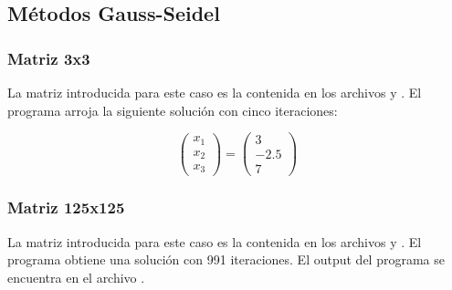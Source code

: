 \subsection{Métodos Gauss-Seidel}

\subsubsection{Matriz 3x3}

La matriz introducida para este caso es la contenida en los archivos  y . El programa arroja la siguiente solución con cinco iteraciones:

\begin{equation*}
    \begin{pmatrix}
        x_1 \\
        x_2 \\
        x_3
    \end{pmatrix} =
    \begin{pmatrix}
        3    \\
        -2.5 \\
        7
    \end{pmatrix}
\end{equation*}
\subsubsection{Matriz 125x125}

La matriz introducida para este caso es la contenida en los archivos  y . El programa obtiene una solución con 991 iteraciones. El output del programa se encuentra en el archivo .